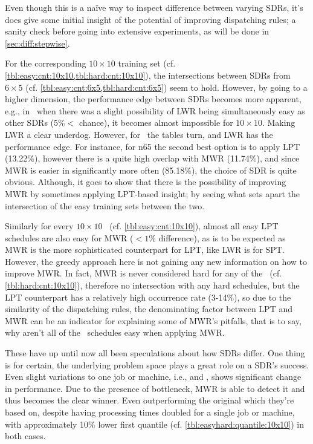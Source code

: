 Even though this is a na\"ive way to inspect difference between varying SDRs, it's does give some initial insight of the potential of improving dispatching rules; a sanity check before going into extensive experiments, as will be done in \cref{sec:diff:stepwise}.

For the corresponding $10\times10$ training set (cf. \cref{tbl:easy:cnt:10x10,tbl:hard:cnt:10x10}), the intersections between SDRs from $6\times5$ (cf. \cref{tbl:easy:cnt:6x5,tbl:hard:cnt:6x5}) seem to hold. However, by going to a higher dimension, the performance edge between SDRs becomes more apparent, e.g., in \JSP\ when there was a slight possibility of LWR being simultaneously easy as other SDRs ($5\%<$ chance), it becomes almost impossible for $10\times10$. Making LWR a clear underdog. However, for \FSP\ the tables turn, and LWR has the performance edge. For instance, for n{6}{5} the second  best option is to apply LPT (13.22\%), however there is a quite high overlap with MWR (11.74\%), and since MWR is easier in significantly more often (85.18\%), the choice of SDR is quite obvious. Although, it goes to show that there is the possibility of improving MWR by sometimes applying LPT-based insight; by seeing what sets apart the intersection of the easy training sets between the two. 

Similarly for every $10\times10$ \JSP\ (cf. \cref{tbl:easy:cnt:10x10}), almost all easy LPT schedules are also easy  for MWR ($<1\%$ difference), as is to be expected as MWR is the more sophisticated counterpart for LPT, like LWR is for SPT. However, the greedy approach here is  not gaining any new information on how to improve MWR. In fact, MWR is never considered hard for any of the \JSP\ (cf. \cref{tbl:hard:cnt:10x10}), therefore no intersection with any hard schedules, but the LPT counterpart has a relatively high occurrence rate (3-14\%), so due to the similarity of the dispatching rules, the denominating factor between LPT and MWR can be an indicator for explaining some of MWR's pitfalls, that is to say, why aren't all of the \jsp\ schedules easy when applying MWR. 

These have up until now all been speculations about how SDRs differ. One thing is for certain, the underlying problem space plays a great role on a SDR's success. Even slight variations to one job or machine, i.e.,  and , shows significant change in performance. Due to the presence of bottleneck, MWR is able to detect it and thus becomes the clear winner. Even outperforming the original  which they're based on, despite having processing times doubled for a single job or machine, with approximately 10\% lower first quantile (cf. \cref{tbl:easyhard:quantile:10x10}) in both cases. 

